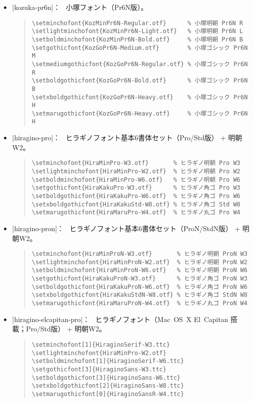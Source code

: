 \documentclass[uplatex,dvipdfmx,a4paper]{jsarticle}
\newcommand{\Means}{：\ }
\begin{document}
\begin{itemize}
\item |kozuka-pr6n|\Means
  小塚フォント（Pr6N版）。
\begin{quote}\small\begin{verbatim}
\setminchofont{KozMinPr6N-Regular.otf}      % 小塚明朝 Pr6N R
\setlightminchofont{KozMinPr6N-Light.otf}   % 小塚明朝 Pr6N L
\setboldminchofont{KozMinPr6N-Bold.otf}     % 小塚明朝 Pr6N B
\setgothicfont{KozGoPr6N-Medium.otf}        % 小塚ゴシック Pr6N M
\setmediumgothicfont{KozGoPr6N-Regular.otf} % 小塚ゴシック Pr6N R
\setboldgothicfont{KozGoPr6N-Bold.otf}      % 小塚ゴシック Pr6N B
\setxboldgothicfont{KozGoPr6N-Heavy.otf}    % 小塚ゴシック Pr6N H
\setmarugothicfont{KozGoPr6N-Heavy.otf}     % 小塚ゴシック Pr6N H
\end{verbatim}\end{quote}

\item |hiragino-pro|\Means
  ヒラギノフォント基本6書体セット（Pro/Std版） + 明朝W2。
\begin{quote}\small\begin{verbatim}
\setminchofont{HiraMinPro-W3.otf}       % ヒラギノ明朝 Pro W3
\setlightminchofont{HiraMinPro-W2.otf}  % ヒラギノ明朝 Pro W2
\setboldminchofont{HiraMinPro-W6.otf}   % ヒラギノ明朝 Pro W6
\setgothicfont{HiraKakuPro-W3.otf}      % ヒラギノ角ゴ Pro W3
\setboldgothicfont{HiraKakuPro-W6.otf}  % ヒラギノ角ゴ Pro W6
\setxboldgothicfont{HiraKakuStd-W8.otf} % ヒラギノ角ゴ Std W8
\setmarugothicfont{HiraMaruPro-W4.otf}  % ヒラギノ丸ゴ Pro W4
\end{verbatim}\end{quote}

\item |hiragino-pron|\Means
  ヒラギノフォント基本6書体セット（ProN/StdN版） + 明朝W2。
\begin{quote}\small\begin{verbatim}
\setminchofont{HiraMinProN-W3.otf}       % ヒラギノ明朝 ProN W3
\setlightminchofont{HiraMinProN-W2.otf}  % ヒラギノ明朝 ProN W2
\setboldminchofont{HiraMinProN-W6.otf}   % ヒラギノ明朝 ProN W6
\setgothicfont{HiraKakuProN-W3.otf}      % ヒラギノ角ゴ ProN W3
\setboldgothicfont{HiraKakuProN-W6.otf}  % ヒラギノ角ゴ ProN W6
\setxboldgothicfont{HiraKakuStdN-W8.otf} % ヒラギノ角ゴ StdN W8
\setmarugothicfont{HiraMaruProN-W4.otf}  % ヒラギノ丸ゴ ProN W4
\end{verbatim}\end{quote}

\item |hiragino-elcapitan-pro|\Means
  ヒラギノフォント（Mac~OS~X El~Capitan 搭載；Pro/Std版） + 明朝W2。
\begin{quote}\small\begin{verbatim}
\setminchofont[1]{HiraginoSerif-W3.ttc}
\setlightminchofont{HiraMinPro-W2.otf}
\setboldminchofont[1]{HiraginoSerif-W6.ttc}
\setgothicfont[3]{HiraginoSans-W3.ttc}
\setboldgothicfont[3]{HiraginoSans-W6.ttc}
\setxboldgothicfont[2]{HiraginoSans-W8.ttc}
\setmarugothicfont[0]{HiraginoSansR-W4.ttc}
\end{verbatim}\end{quote}


\end{itemize}
\end{document}
